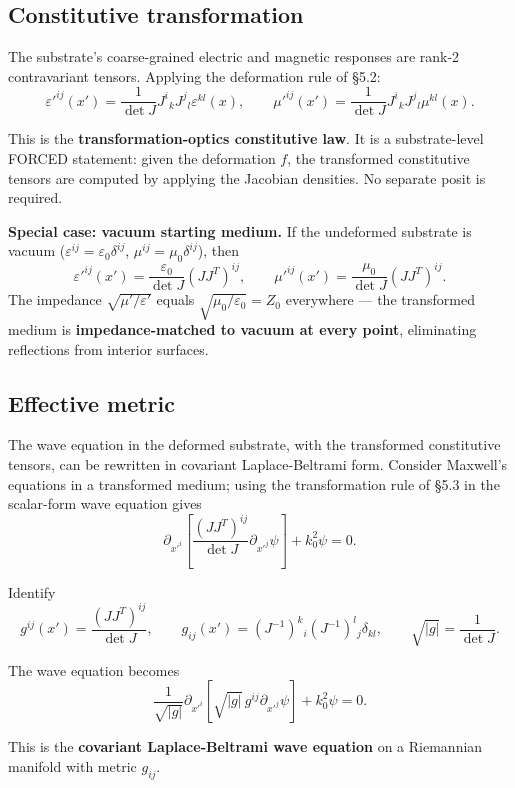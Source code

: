 \documentclass[11pt,a4paper]{article}
\begin{document}
\subsection{Constitutive transformation}

The substrate's coarse-grained electric and magnetic responses are rank-2 contravariant tensors. Applying the deformation rule of \S5.2:
\[
\boxed{\varepsilon'^{ij}(x') = \frac{1}{\det J} J^i{}_k J^j{}_l \varepsilon^{kl}(x), \qquad \mu'^{ij}(x') = \frac{1}{\det J} J^i{}_k J^j{}_l \mu^{kl}(x).}
\]

This is the \textbf{transformation-optics constitutive law}. It is a substrate-level FORCED statement: given the deformation $f$, the transformed constitutive tensors are computed by applying the Jacobian densities. No separate posit is required.

\textbf{Special case: vacuum starting medium.} If the undeformed substrate is vacuum ($\varepsilon^{ij} = \varepsilon_0\delta^{ij}$, $\mu^{ij} = \mu_0\delta^{ij}$), then
\[
\varepsilon'^{ij}(x') = \frac{\varepsilon_0}{\det J}(JJ^T)^{ij}, \qquad \mu'^{ij}(x') = \frac{\mu_0}{\det J}(JJ^T)^{ij}.
\]
The impedance $\sqrt{\mu'/\varepsilon'}$ equals $\sqrt{\mu_0/\varepsilon_0} = Z_0$ everywhere --- the transformed medium is \textbf{impedance-matched to vacuum at every point}, eliminating reflections from interior surfaces.

\subsection{Effective metric}

The wave equation in the deformed substrate, with the transformed constitutive tensors, can be rewritten in covariant Laplace-Beltrami form. Consider Maxwell's equations in a transformed medium; using the transformation rule of \S5.3 in the scalar-form wave equation gives
\[
\partial_{x'^i}\!\left[\frac{(JJ^T)^{ij}}{\det J}\partial_{x'^j}\psi\right] + k_0^2\psi = 0.
\]

Identify
\[
\boxed{g^{ij}(x') = \frac{(JJ^T)^{ij}}{\det J}, \qquad g_{ij}(x') = (J^{-1})^k{}_i (J^{-1})^l{}_j \delta_{kl}, \qquad \sqrt{|g|} = \frac{1}{\det J}.}
\]

The wave equation becomes
\[
\frac{1}{\sqrt{|g|}}\partial_{x'^i}\!\left[\sqrt{|g|}\,g^{ij}\partial_{x'^j}\psi\right] + k_0^2\psi = 0.
\]

This is the \textbf{covariant Laplace-Beltrami wave equation} on a Riemannian manifold with metric $g_{ij}$.
\end{document}
